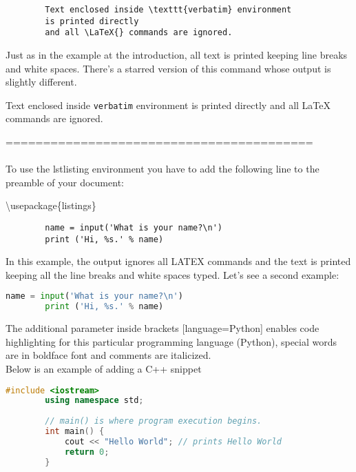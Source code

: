 \documentclass{article}
\begin{document}
	
	\begin{verbatim}
		Text enclosed inside \texttt{verbatim} environment 
		is printed directly 
		and all \LaTeX{} commands are ignored.
	\end{verbatim}
	
	Just as in the example at the introduction, all text is printed keeping line breaks and white spaces. There's a starred version of this command whose output is slightly different.
	\begin{verbatim*}
		Text enclosed inside \texttt{verbatim} environment 
		is printed directly 
		and all \LaTeX{} commands are ignored.
	\end{verbatim*}
	
	=========================================\\\\
	
	To use the lstlisting environment you have to add the following line to the preamble of your document:
	
	\textbackslash usepackage\{listings\}
	
	\begin{lstlisting}
		name = input('What is your name?\n')
		print ('Hi, %s.' % name)
	\end{lstlisting}
	
	In this example, the output ignores all LATEX commands and the text is printed keeping all the line breaks and white spaces typed. Let's see a second example:\\
	
	\begin{lstlisting}[language=Python]
		name = input('What is your name?\n')
		print ('Hi, %s.' % name)
	\end{lstlisting}
	The additional parameter inside brackets [language=Python] enables code highlighting for this particular programming language (Python), special words are in boldface font and comments are italicized.\\
	
	Below is an example of adding a C++ snippet\\
	\begin{lstlisting}[language=C++]
		#include <iostream>
		using namespace std;
		
		// main() is where program execution begins.
		int main() {
			cout << "Hello World"; // prints Hello World
			return 0;
		}
	\end{lstlisting}
	
\end{document}
